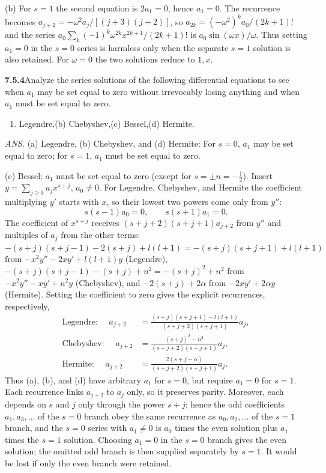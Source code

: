 (b) For $s=1$ the second equation is $2a_1=0$, hence $a_1=0$.
The recurrence becomes $a_{j+2}=-\omega^2a_j/[(j+3)(j+2)]$, so
$a_{2k}=(-\omega^2)^ka_0/(2k+1)!$ and the series
$a_0\sum_k(-1)^k\omega^{2k}x^{2k+1}/(2k+1)!$ is
$a_0\sin(\omega x)/\omega$. Thus setting $a_1=0$ in the
$s=0$ series is harmless only when the separate $s=1$ solution is also
retained. For $\omega=0$ the two solutions reduce to $1,x$.

\par\bigskip
\noindent\textbf{7.5.4}\quad Analyze the series solutions of the following
differential equations to see when $a_{1}$ may be set equal to zero without
irrevocably losing anything and when $a_{1}$ must be set equal to zero.
\begin{enumerate}
\item[(a)] Legendre,\quad(b) Chebyshev,\quad(c) Bessel,\quad(d) Hermite.
\end{enumerate}
\par\nobreak\hfill\emph{ANS.}\enspace
(a) Legendre, (b) Chebyshev, and (d) Hermite: For $s=0$, $a_{1}$ may be set
equal to zero; for $s=1$, $a_{1}$ must be set equal to zero.\par
\nobreak\hfill(c) Bessel: $a_{1}$ must be set equal to zero (except for
$s=\pm n=-\frac{1}{2}$).
\solution
Insert $y=\sum_{j\ge0}a_jx^{s+j}$, $a_0\ne0$. For Legendre,
Chebyshev, and Hermite the coefficient multiplying $y'$ starts with $x$,
so their lowest two powers come only from $y''$:
\[
s(s-1)a_0=0,\qquad s(s+1)a_1=0.
\]
The coefficient of $x^{s+j}$ receives $(s+j+2)(s+j+1)a_{j+2}$ from
$y''$ and multiples of $a_j$ from the other terms:
$-(s+j)(s+j-1)-2(s+j)+l(l+1)=-(s+j)(s+j+1)+l(l+1)$ from
$-x^2y''-2xy'+l(l+1)y$ (Legendre),
$-(s+j)(s+j-1)-(s+j)+n^2=-(s+j)^2+n^2$ from $-x^2y''-xy'+n^2y$
(Chebyshev), and $-2(s+j)+2\alpha$ from $-2xy'+2\alpha y$ (Hermite).
Setting the coefficient to zero gives the explicit recurrences,
respectively,
\begin{align*}
\text{Legendre: }\quad
 a_{j+2}&=\frac{(s+j)(s+j+1)-l(l+1)}{(s+j+2)(s+j+1)}a_j,\\
\text{Chebyshev: }\quad
 a_{j+2}&=\frac{(s+j)^2-n^2}{(s+j+2)(s+j+1)}a_j,\\
\text{Hermite: }\quad
 a_{j+2}&=\frac{2(s+j-\alpha)}{(s+j+2)(s+j+1)}a_j.
\end{align*}
Thus (a), (b), and (d) have arbitrary $a_1$ for $s=0$, but require
$a_1=0$ for $s=1$. Each recurrence links $a_{j+2}$ to $a_j$ only, so it
preserves parity. Moreover, each depends on $s$ and $j$ only through the
power $s+j$; hence the odd coefficients $a_1,a_3,\ldots$ of the $s=0$
branch obey the same recurrence as $a_0,a_2,\ldots$ of the $s=1$ branch,
and the $s=0$ series with $a_1\ne0$ is $a_0$ times the even solution plus
$a_1$ times the $s=1$ solution. Choosing $a_1=0$
in the $s=0$ branch gives the even solution; the omitted odd branch is
then supplied separately by $s=1$. It would be lost if only the even
branch were retained.

